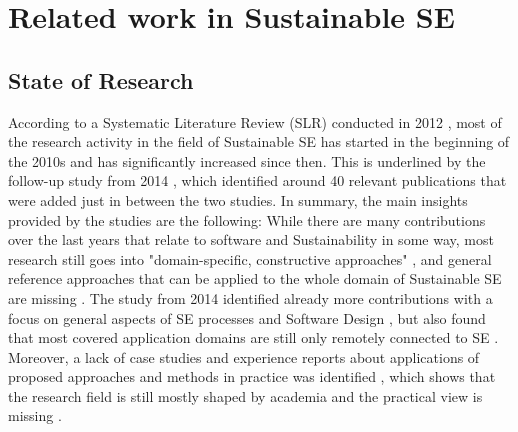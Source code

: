 \documentclass[oribibl]{llncs}
\begin{document}
\section{Related work in Sustainable SE} 
\subsection{State of Research\label{stateOfResearch}} %
According to a Systematic Literature Review (SLR) conducted in 2012 \cite{penzenstadler_sustainability_2012}, most of the research activity in the field of Sustainable SE has started in the beginning of the 2010s and has significantly increased since then. This is underlined by the follow-up study from 2014 \cite{penzenstadler_systematic_2014}, which identified around 40 relevant publications that were added just in between the two studies. In summary, the main insights provided by the studies are the following: While there are many contributions over the last years that relate to software and Sustainability in some way, most research still goes into "domain-specific, constructive approaches" \cite[p.\,5]{penzenstadler_sustainability_2012}, and general reference approaches that can be applied to the whole domain of Sustainable SE are missing \cite{penzenstadler_sustainability_2012}. The study from 2014 identified already more contributions with a focus on general aspects of SE processes and Software Design \cite{penzenstadler_systematic_2014}, but also found that most covered application domains are still only remotely connected to SE \cite{penzenstadler_systematic_2014}. Moreover, a lack of case studies and experience reports about applications of proposed approaches and methods in practice was identified \cite{penzenstadler_sustainability_2012}, which shows that the research field is still mostly shaped by academia and the practical view is missing \cite{penzenstadler_systematic_2014}.\\
\end{document}
